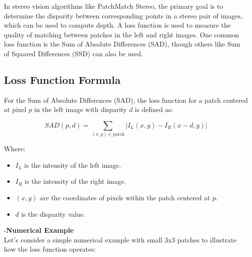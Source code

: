 \documentclass[22pt]{report}
\begin{document}
In stereo vision algorithms like PatchMatch Stereo, the primary goal is to determine the disparity between corresponding points in a stereo pair of images, which can be used to compute depth. A loss function is used to measure the quality of matching between patches in the left and right images. One common loss function is the Sum of Absolute Differences (SAD), though others like Sum of Squared Differences (SSD) can also be used.\\
\subsection{Loss Function Formula}
For the Sum of Absolute Differences (SAD), the loss function for a patch centered at pixel \( p \) in the left image with disparity \( d \) is defined as:

\[
SAD(p,d) = \sum_{(x,y) \in \text{patch}} |I_L(x,y) - I_R(x-d,y)|
\]

Where:

\begin{itemize}
    \item \( I_L \) is the intensity of the left image. \\
    \item \( I_R \) is the intensity of the right image. \\
    \item \( (x,y) \) are the coordinates of pixels within the patch centered at \( p \). \\
    \item \( d \) is the disparity value.
\end{itemize}
-\textbf{Numerical Example} \\

Let's consider a simple numerical example with small 3x3 patches to illustrate how the loss function operates:
\end{document}
